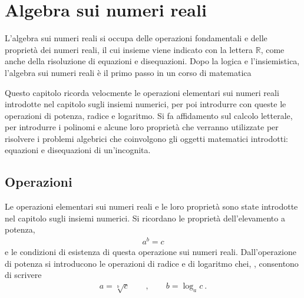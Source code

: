 \documentclass[letterpaper,10pt,italian]{jupyterBook}
\begin{document}
\sphinxstepscope




\chapter{Algebra sui numeri reali}
\label{\detokenize{ch/algebra/real-algebra:algebra-sui-numeri-reali}}\label{\detokenize{ch/algebra/real-algebra:math-hs-algebra-real}}\label{\detokenize{ch/algebra/real-algebra::doc}}
\sphinxAtStartPar
L’algebra sui numeri reali si occupa delle operazioni fondamentali e delle proprietà dei numeri reali, il cui insieme viene indicato con la lettera \(\mathbb{R}\), come anche della risoluzione di equazioni e disequazioni. Dopo la logica e l’insiemistica, l’algebra sui numeri reali è il primo passo in un corso di matematica  

\sphinxAtStartPar
Questo capitolo ricorda velocmente le operazioni elementari sui numeri reali introdotte nel capitolo sugli insiemi numerici, per poi introdurre con queste le operazioni di potenza, radice e logaritmo. Si fa affidamento sul calcolo letterale, per introdurre i polinomi e alcune loro proprietà che verranno utilizzate per risolvere i problemi algebrici che coinvolgono gli oggetti matematici introdotti: equazioni e disequazioni di un’incognita.


\section{Operazioni}
\label{\detokenize{ch/algebra/real-algebra:operazioni}}
\sphinxAtStartPar
Le operazioni elementari sui numeri reali e le loro proprietà sono state introdotte nel capitolo sugli insiemi numerici. Si ricordano le proprietà dell’elevamento a potenza,
\begin{equation*}
\begin{split}a^b = c\end{split}
\end{equation*}
\sphinxAtStartPar
e le condizioni di esistenza di questa operazione sui numeri reali. Dall’operazione di potenza si introducono le operazioni di radice e di logaritmo chei, , consentono di scrivere
\begin{equation*}
\begin{split}a = \sqrt[b]{c} \qquad , \qquad b = \log_{a} c \ .\end{split}
\end{equation*}
\end{document}
